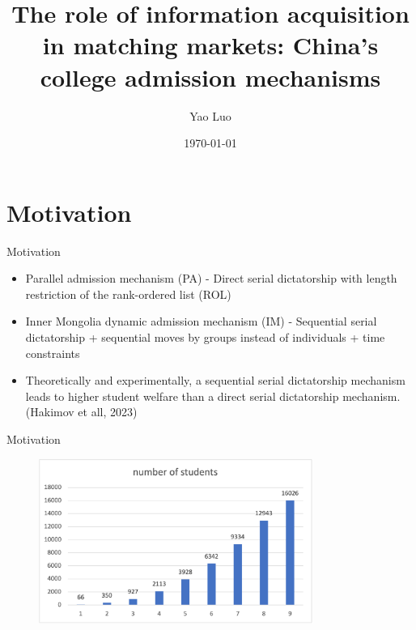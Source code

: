 \documentclass[dvipsnames,mathserif]{beamer}
\begin{document}
\rightskip\rightmargin
\title{The role of information acquisition in matching markets: China's college admission mechanisms}
\author{Yao Luo}


\footnotesize{\date{\today }


\begin{frame}
\maketitle
\end{frame}


%
\section{Motivation}
\begin{frame}{Motivation}
    \begin{itemize}
        \item Parallel admission mechanism (PA) - Direct serial dictatorship with length restriction of the rank-ordered list (ROL)\\
        \item Inner Mongolia dynamic admission mechanism (IM) - Sequential serial dictatorship + sequential moves by groups instead of individuals + time constraints\\
        \item Theoretically and experimentally, a sequential serial dictatorship mechanism leads to higher student welfare than a direct serial dictatorship mechanism. (Hakimov et all, 2023)

    \end{itemize}
\end{frame}
\begin{frame}{Motivation}
\begin{figure}[h!]
\centering
\includegraphics[width=0.8\textwidth]{1.png}
\end{figure}
\end{frame}

}
\end{document}
